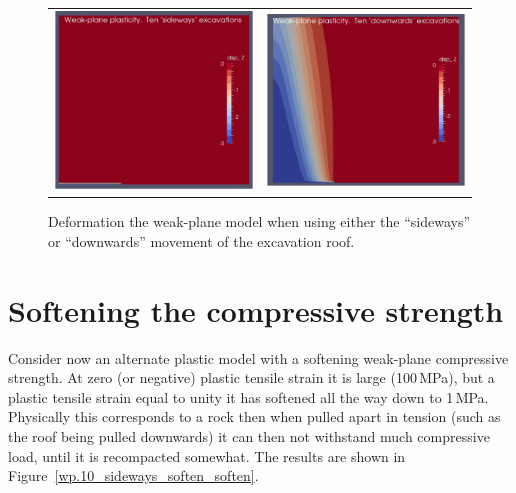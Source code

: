 \documentclass[]{scrreprt}
\begin{document}
\begin{figure}[htb]
\begin{center}
\begin{tabular}{cc}
\includegraphics[width=6cm]{wp_only_10_sideways_disp.pdf} &
\includegraphics[width=6cm]{wp_only_10_downwards_disp.pdf}
\end{tabular}
\caption{Deformation the weak-plane model when using either the
  ``sideways'' or ``downwards'' movement of the excavation roof.}
\label{wp.10_step}
\end{center}
\end{figure}

\section{Softening the compressive strength}

Consider now an alternate plastic model with a softening weak-plane
compressive strength.  At zero (or negative) plastic tensile strain it
is large (100\,MPa), but a plastic tensile strain equal to unity it
has softened all the way down to 1\,MPa.  Physically this corresponds
to a rock then when pulled apart in tension (such as the roof being
pulled downwards) it can then not withstand much compressive load,
until it is recompacted somewhat.  The results are shown in Figure~\ref{wp.10_sideways_soften_soften}.
\end{document}
